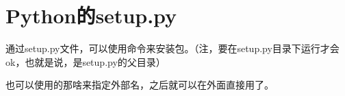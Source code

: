 \section{Python的setup.py}

通过setup.py文件，可以使用命令来安装包。（注，要在setup.py目录下运行才会ok，也就是说，是setup.py的父目录）

也可以使用的那啥来指定外部名，之后就可以在外面直接用了。
